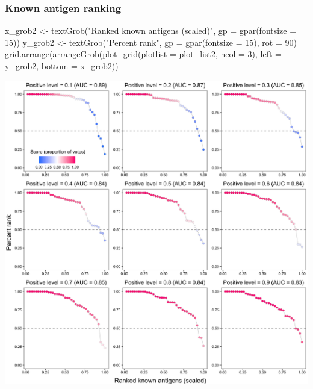 \documentclass[
  11pt,
  oneside]{book}
\newenvironment{Shaded}{\begin{snugshade}}{\end{snugshade}}
\newcommand{\AttributeTok}[1]{\textcolor[rgb]{0.77,0.63,0.00}{#1}}
\newcommand{\DecValTok}[1]{\textcolor[rgb]{0.00,0.00,0.81}{#1}}
\newcommand{\FunctionTok}[1]{\textcolor[rgb]{0.00,0.00,0.00}{#1}}
\newcommand{\NormalTok}[1]{#1}
\newcommand{\OtherTok}[1]{\textcolor[rgb]{0.56,0.35,0.01}{#1}}
\newcommand{\StringTok}[1]{\textcolor[rgb]{0.31,0.60,0.02}{#1}}
\begin{document}
\hypertarget{known-antigen-ranking}{%
\subsubsection{Known antigen ranking}\label{known-antigen-ranking}}

\begin{Shaded}
\begin{Highlighting}[]
\NormalTok{x\_grob2 }\OtherTok{\textless{}{-}} \FunctionTok{textGrob}\NormalTok{(}\StringTok{"Ranked known antigens (scaled)"}\NormalTok{, }\AttributeTok{gp =} \FunctionTok{gpar}\NormalTok{(}\AttributeTok{fontsize =} \DecValTok{15}\NormalTok{))}
\NormalTok{y\_grob2 }\OtherTok{\textless{}{-}} \FunctionTok{textGrob}\NormalTok{(}\StringTok{"Percent rank"}\NormalTok{, }\AttributeTok{gp =} \FunctionTok{gpar}\NormalTok{(}\AttributeTok{fontsize =} \DecValTok{15}\NormalTok{), }\AttributeTok{rot =} \DecValTok{90}\NormalTok{)}
\FunctionTok{grid.arrange}\NormalTok{(}\FunctionTok{arrangeGrob}\NormalTok{(}\FunctionTok{plot\_grid}\NormalTok{(}\AttributeTok{plotlist =}\NormalTok{ plot\_list2, }\AttributeTok{ncol =} \DecValTok{3}\NormalTok{), }\AttributeTok{left =}\NormalTok{ y\_grob2, }\AttributeTok{bottom =}\NormalTok{ x\_grob2))}
\end{Highlighting}
\end{Shaded}

\begin{center}\includegraphics[width=1\linewidth]{./figures/Supplementary Fig 2} \end{center}
\end{document}
